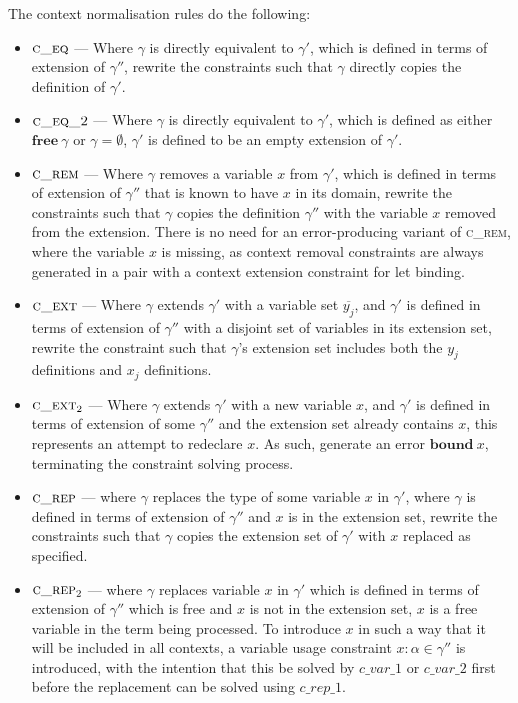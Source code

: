 \documentclass[preprint]{sigplanconf}
\newcommand{\free}[1]{\mathbf{free}\:#1}
\begin{document}
The context normalisation rules do the following:

\begin{itemize}
\item $\textsc{c\_eq}$ --- Where $\gamma$ is directly equivalent
to $\gamma'$, which is defined in terms of extension of
$\gamma''$, rewrite the constraints such that
$\gamma$ directly copies the definition of $\gamma'$.
\item $\textsc{c\_eq\_2}$ --- Where $\gamma$ is directly equivalent
to $\gamma'$, which is defined as either $\free{\gamma}$ or 
$\gamma = \emptyset$, $\gamma'$ is defined to be an empty extension of 
$\gamma'$.

\item $\textsc{c\_rem}$ --- Where $\gamma$ removes a variable $x$ from $\gamma'$,
which is defined in terms of extension of $\gamma''$ that is known to have
$x$ in its domain, rewrite the
constraints such that $\gamma$ copies the definition $\gamma''$ with
the variable $x$ removed from the extension. There is no need for an
error-producing variant of \textsc{c\_rem}, where the variable $x$ is missing, 
as context removal constraints are always generated in a pair with a context 
extension constraint for let binding.

\item $\textsc{c\_ext}$ --- Where $\gamma$ extends $\gamma'$ with
a variable set $\overline{y_j}$, and $\gamma'$ is defined in terms of extension of
$\gamma''$ with a disjoint set of variables in its extension set, rewrite the
constraint such that $\gamma$'s extension set includes both the $y_j$
definitions and $x_j$ definitions.

\item $\textsc{c\_ext}_2$ --- Where $\gamma$ extends $\gamma'$ with
a new variable $x$, and $\gamma'$ is defined in terms of extension of
some $\gamma''$ and the extension set already contains $x$, this
represents an attempt to redeclare $x$. As such, generate an error
$\mathbf{bound}\:x$, terminating the constraint solving process.

\item $\textsc{c\_rep}$ --- where $\gamma$ replaces the type of some
variable $x$ in $\gamma'$, where $\gamma$ is defined in terms of extension
of $\gamma''$ and $x$ is in the extension set, rewrite the constraints
such that $\gamma$ copies the extension set of $\gamma'$ with $x$
replaced as specified.

\item $\textsc{c\_rep}_2$ --- where $\gamma$ replaces variable $x$ in
$\gamma'$ which is defined in terms of extension of $\gamma''$
which is free and $x$ is not in the extension set, $x$ is a
free variable in the term being processed. To introduce $x$ in such a way that
it will be included in all contexts, a variable usage constraint
$x : \alpha \in \gamma''$ is introduced, with the intention that this be
solved by $c\_var\_1$ or $c\_var\_2$ first before the replacement can be
solved using $c\_rep\_1$.


\end{itemize}
\end{document}
